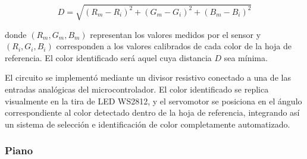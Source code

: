 \begin{equation}\label{eq:distancia_color}
D = \sqrt{(R_m - R_i)^2 + (G_m - G_i)^2 + (B_m - B_i)^2}
\end{equation}

donde $(R_m, G_m, B_m)$ representan los valores medidos por el sensor y $(R_i, G_i, B_i)$ corresponden a los valores calibrados de cada color de la hoja de referencia. El color identificado será aquel cuya distancia $D$ sea mínima.



\vspace{1em}

El circuito se implementó mediante un divisor resistivo conectado a una de las entradas analógicas del microcontrolador. El color identificado se replica visualmente en la tira de LED WS2812, y el servomotor se posiciona en el ángulo correspondiente al color detectado dentro de la hoja de referencia, integrando así un sistema de selección e identificación de color completamente automatizado.












\subsubsection{Piano}








